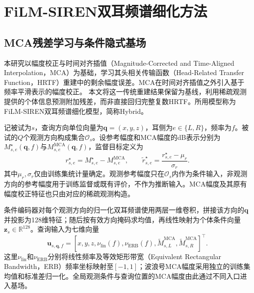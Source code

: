 \section{FiLM-SIREN双耳频谱细化方法}
\label{sec:method}

\subsection{MCA残差学习与条件隐式基场}
本研究以幅度校正与时间对齐插值（Magnitude-Corrected and Time-Aligned Interpolation，MCA）为基础，学习其头相关传输函数（Head-Related Transfer Function，HRTF）重建中的剩余幅度误差。MCA在时间对齐插值之外引入基于频率平滑表示的幅度校正\cite{R1}。%
本文将这一传统重建结果保留为基线，利用稀疏观测提供的个体信息预测附加残差，而非直接回归完整复数HRTF。所用模型称为FiLM-SIREN双耳频谱细化模型，简称Hybrid。

记被试为$s$，查询方向单位向量为$\mathbf q=(x,y,z)$，耳侧为$e\in\{L,R\}$，频率为$f$。被试的$Q$个观测方向构成集合$\mathcal O_s$。设参考幅度和MCA幅度的dB表示分别为$M^\star_{s,e}(\mathbf q,f)$与$M^{\mathrm{MCA}}_{s,e}(\mathbf q,f)$，监督目标定义为
\begin{equation}
r^\star_{s,e}=M^\star_{s,e}-M^{\mathrm{MCA}}_{s,e},\qquad
\widetilde r^\star_{s,e}=\frac{r^\star_{s,e}-\mu_r}{\sigma_r}.
\label{eq:residual-target}
\end{equation}
其中$\mu_r,\sigma_r$仅由训练集统计量确定。观测参考幅度只在$\mathcal O_s$内作为条件输入，非观测方向的参考幅度用于训练监督或既有评价，不作为推断输入。MCA幅度及其原有幅度校正特征也只由对应的稀疏观测构造。

条件编码器对每个观测方向的归一化双耳频谱使用两层一维卷积，拼接该方向的$\mathbf q$并投影为128维特征；随后按有效方向掩码求均值，再线性映射为个体条件向量$\mathbf z_s\in\mathbb R^{128}$。查询输入为七维向量
\begin{equation}
\mathbf u_{s,\mathbf q,f}=
[x,y,z,\nu_{\mathrm{lin}}(f),\nu_{\mathrm{ERB}}(f),
 \widetilde M^{\mathrm{MCA}}_{s,L},\widetilde M^{\mathrm{MCA}}_{s,R}]^\top .
\end{equation}
这里$\nu_{\mathrm{lin}}$和$\nu_{\mathrm{ERB}}$分别将线性频率及等效矩形带宽（Equivalent Rectangular Bandwidth，ERB）频率坐标映射至$[-1,1]$；波浪号MCA幅度采用独立的训练集均值和标准差归一化。全局观测条件与查询位置的MCA幅度由此通过不同入口进入基场。

